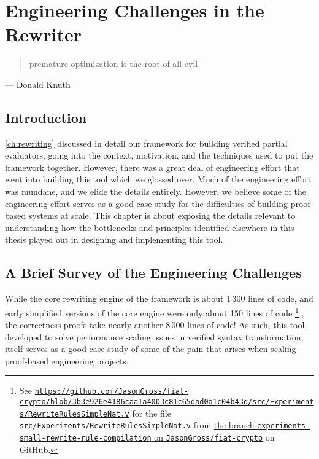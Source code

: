 \chapter{Engineering Challenges in the Rewriter}\label{ch:rewriting-more}

\begin{quote}
  premature optimization is the root of all evil
\end{quote}
\begin{flushright}
  --- Donald Knuth
\end{flushright}

\section{Introduction}\label{sec:rewriting-more:intro}
\autoref{ch:rewriting} discussed in detail our framework for building verified partial evaluators, going into the context, motivation, and the techniques used to put the framework together.
However, there was a great deal of engineering effort that went into building this tool which we glossed over.
Much of the engineering effort was mundane, and we elide the details entirely.
However, we believe some of the engineering effort serves as a good case-study for the difficulties of building proof-based systems at scale.
This chapter is about exposing the details relevant to understanding how the bottlenecks and principles identified elsewhere in this thesis played out in designing and implementing this tool.

\section{A Brief Survey of the Engineering Challenges}\label{sec:rewriting-more:challenges-overview}

While the core rewriting engine of the framework is about 1\,300 lines of code, and early simplified versions of the core engine were only about 150 lines of code%
\footnote{%
See \href{https://web.archive.org/web/20200716002534/https://github.com/JasonGross/fiat-crypto/blob/3b3e926e4186caa1a4003c81c65dad0a1c04b43d/src/Experiments/RewriteRulesSimpleNat.v}{\texttt{https://github.com/JasonGross/fiat-crypto/blob/3b3e926e4186caa1a4003c81c65dad0a1c04b43d/src/Experiments/RewriteRulesSimpleNat.v}} for the file \texttt{src/Experiments/RewriteRulesSimpleNat.v} from \href{https://github.com/JasonGross/fiat-crypto/tree/experiments-small-rewrite-rule-compilation}{the branch \texttt{experiments-small-rewrite-rule-compilation} on \texttt{JasonGross/fiat-crypto}} on GitHub.%
}%
, the correctness proofs take nearly another 8\,000 lines of code!
As such, this tool, developed to solve performance scaling issues in verified syntax transformation, itself serves as a good case study of some of the pain that arises when scaling proof-based engineering projects.

